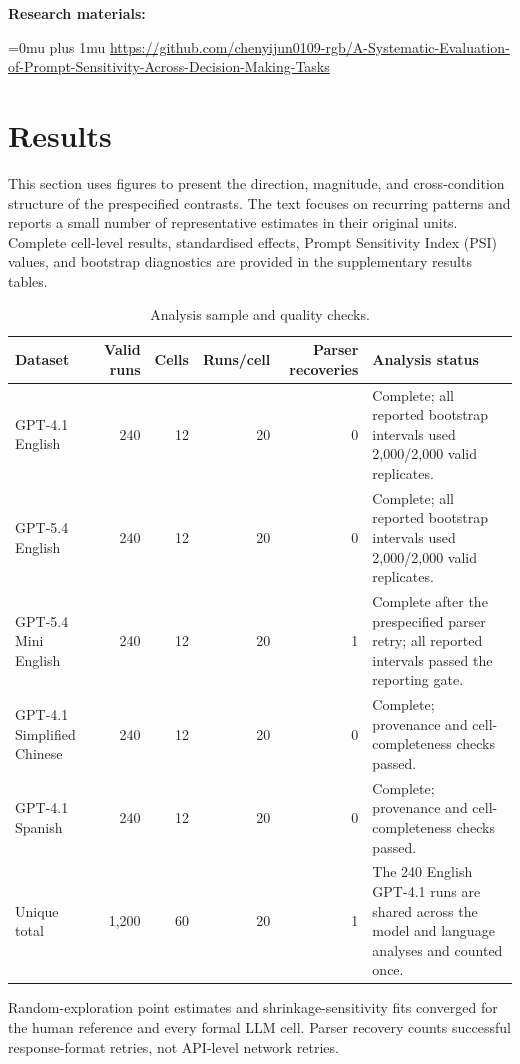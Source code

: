 \documentclass[logo,msc]{infthesis}
\begin{document}
\noindent\textbf{Research materials:}\par
\begingroup
\raggedright
\Urlmuskip=0mu plus 1mu\relax
\url{https://github.com/chenyijun0109-rgb/A-Systematic-Evaluation-of-Prompt-Sensitivity-Across-Decision-Making-Tasks}
\par
\endgroup
\chapter{Results}
\label{sec:results}

This section uses figures to present the direction, magnitude, and cross-condition structure of the prespecified contrasts. The text focuses on recurring patterns and reports a small number of representative estimates in their original units. Complete cell-level results, standardised effects, Prompt Sensitivity Index (PSI) values, and bootstrap diagnostics are provided in the supplementary results tables.


\begin{table}[htbp]
\centering
\caption{Analysis sample and quality checks.}
\label{tab:results_quality}
\begin{tabularx}{\textwidth}{lrrrrX}
\toprule
Dataset & Valid runs & Cells & Runs/cell & Parser recoveries & Analysis status \\
\midrule
GPT-4.1 English & 240 & 12 & 20 & 0 & Complete; all reported bootstrap intervals used 2,000/2,000 valid replicates. \\
GPT-5.4 English & 240 & 12 & 20 & 0 & Complete; all reported bootstrap intervals used 2,000/2,000 valid replicates. \\
GPT-5.4 Mini English & 240 & 12 & 20 & 1 & Complete after the prespecified parser retry; all reported intervals passed the reporting gate. \\
GPT-4.1 Simplified Chinese & 240 & 12 & 20 & 0 & Complete; provenance and cell-completeness checks passed. \\
GPT-4.1 Spanish & 240 & 12 & 20 & 0 & Complete; provenance and cell-completeness checks passed. \\
\midrule
Unique total & 1,200 & 60 & 20 & 1 & The 240 English GPT-4.1 runs are shared across the model and language analyses and counted once. \\
\bottomrule
\end{tabularx}
\begin{flushleft}
Random-exploration point estimates and shrinkage-sensitivity fits converged for the human reference and every formal LLM cell. Parser recovery counts successful response-format retries, not API-level network retries.
\end{flushleft}
\end{table}
\end{document}
